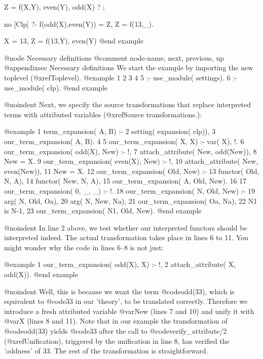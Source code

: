 Z = f(X,Y),
even(Y),
odd(X) ? ;

no
[Clp] ?- f(odd(X),even(Y)) = Z, Z = f(13,_).

X = 13,
Z = f(13,Y),
even(Y)
@end example

@node Necessary definitions    
@comment  node-name,  next,  previous,  up
@appendixsec Necessary definitions
We start the example by importing the new toplevel (@xref{Toplevel}).
@example
     1 %
     2 %
     3 %
     4	     
     5 :- use_module( settings).
     6 :- use_module( clp).
@end example

@noindent
Next, we specify the source transformations that replace interpreted
terms with attributed variables (@xref{Source transformations}.):

@example
     1	term_expansion( A, B) :-
     2	  setting( expansion( clp)),
     3	  our_term_expansion( A, B).
     4	       
     5	our_term_expansion( X,       X) :- var( X), !.
     6	our_term_expansion( odd(X),  New) :- !, 
     7	  attach_attribute( New, odd(New)),  
     8	  New = X.
     9	our_term_expansion( even(X), New) :- !, 
    10	  attach_attribute( New, even(New)), 
    11	  New = X.
    12	our_term_expansion( Old,     New) :- 
    13	  functor( Old, N, A),
    14	  functor( New, N, A),
    15	  our_term_expansion( A, Old, New).
    16	
    17	our_term_expansion( 0, _,   _) :- !.
    18	our_term_expansion( N, Old, New) :-
    19	  arg( N, Old, Oa),
    20	  arg( N, New, Na),
    21	  our_term_expansion( Oa, Na),
    22	  N1 is N-1,
    23	  our_term_expansion( N1, Old, New).
@end example

@noindent
In line 2 above, we test whether our interpreted functors should be
interpreted indeed. The actual transformation takes place in lines 6 to
11. You might wonder why the code in lines 6--8 is not just:

@example
     1	our_term_expansion( odd(X),  X) :- !, 
     2	  attach_attribute( X, odd(X)).
@end example

@noindent
Well, this is because we want the term @code{odd(33)}, which is
equivalent to @code{33} in our 'theory', to be translated correctly.
Therefore we introduce a fresh attributed variable @var{New} (lines 7
and 10) and unify it with @var{X} (lines 8 and 11). Note that in our
example the transformation of @code{odd(33)} yields @code{33} after the
call to @code{verify_attribute/2} (@xref{Unification}), triggered by the
unification in line 8, has verified the 'oddness' of 33. The rest of the
transformation is straightforward.

